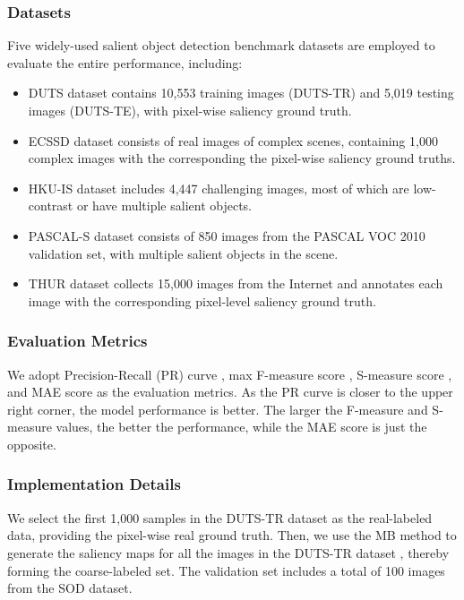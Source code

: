 \documentclass[journal]{IEEEtran}
\begin{document}
\subsubsection{Datasets}
Five widely-used salient object detection benchmark datasets are employed to evaluate the entire performance, including:
\begin{itemize}
\item DUTS \cite{wang2017learning} dataset contains 10,553 training images (DUTS-TR) and 5,019 testing images (DUTS-TE), with pixel-wise saliency ground truth.
    \item ECSSD \cite{yan2013hierarchical} dataset consists of real images of complex scenes, containing 1,000 complex images with the corresponding the pixel-wise saliency ground truths.
    \item HKU-IS \cite{li2015visual} dataset includes 4,447 challenging images, most of which are low-contrast or have multiple salient objects.
    \item PASCAL-S \cite{li2014secrets} dataset consists of 850 images from the PASCAL VOC 2010 validation set, with multiple salient objects in the scene.
    \item THUR \cite{DBLP:journals/vc/ChengMHH14} dataset collects 15,000 images from the Internet and annotates each image with the corresponding pixel-level saliency ground truth.

\end{itemize}



\subsubsection{Evaluation Metrics}
We adopt Precision-Recall (PR) curve  \cite{crm2019tip,crm2020going},  max F-measure score \cite{crm2018tip,crm2019tc}, S-measure score \cite{fan2017structure}, and MAE score \cite{crmICME,crm2019tmm} as the evaluation metrics.
As the PR curve is closer to the upper right corner, the model performance is better. The larger the F-measure and S-measure values, the better the performance, while the MAE score is just the opposite.








\subsubsection{Implementation Details}
We select the first 1,000 samples in the DUTS-TR dataset \cite{wang2017learning} as the real-labeled data, providing the pixel-wise real ground truth.  Then, we use the MB method \cite{zhang2015minimum} to generate the saliency maps for all the images in the DUTS-TR dataset \cite{wang2017learning}, thereby forming the coarse-labeled set. The validation set includes a total of 100 images from the SOD dataset\cite{DBLP:conf/cvpr/MovahediE10}.
\end{document}
